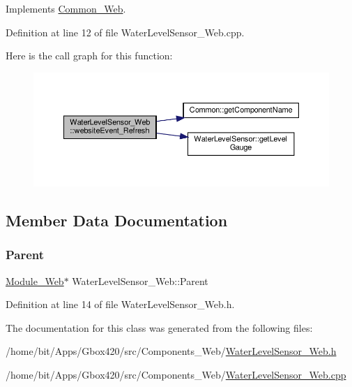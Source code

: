 Implements \hyperlink{class_common___web_aaca7c54fdcf908e4e1256b7b1f6fc212}{Common\+\_\+\+Web}.



Definition at line 12 of file Water\+Level\+Sensor\+\_\+\+Web.\+cpp.

Here is the call graph for this function\+:
\nopagebreak
\begin{figure}[H]
\begin{center}
\leavevmode
\includegraphics[width=350pt]{class_water_level_sensor___web_a8caf8178b0128bad72e78c1c662af5c0_cgraph}
\end{center}
\end{figure}


\subsection{Member Data Documentation}
\mbox{\label{class_water_level_sensor___web_af6804f9dcdd8e9fdbd47d13bac1d3373}} 
\subsubsection{\texorpdfstring{Parent}{Parent}}
{\footnotesize\ttfamily \hyperlink{class_module___web}{Module\+\_\+\+Web}$\ast$ Water\+Level\+Sensor\+\_\+\+Web\+::\+Parent\hspace{0.3cm}{\ttfamily [protected]}}



Definition at line 14 of file Water\+Level\+Sensor\+\_\+\+Web.\+h.



The documentation for this class was generated from the following files\+:\begin{DoxyCompactItemize}
\item 
/home/bit/\+Apps/\+Gbox420/src/\+Components\+\_\+\+Web/\hyperlink{_water_level_sensor___web_8h}{Water\+Level\+Sensor\+\_\+\+Web.\+h}\item 
/home/bit/\+Apps/\+Gbox420/src/\+Components\+\_\+\+Web/\hyperlink{_water_level_sensor___web_8cpp}{Water\+Level\+Sensor\+\_\+\+Web.\+cpp}\end{DoxyCompactItemize}

